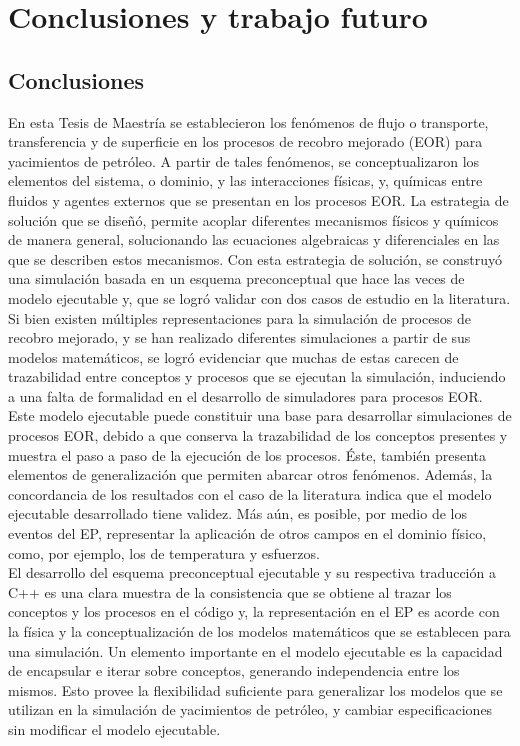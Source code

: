 \chapter{Conclusiones y trabajo futuro}\label{cap:Conclusiones}
\section{Conclusiones}


En esta Tesis de Maestría se establecieron los fenómenos de flujo o transporte, transferencia y de superficie en los procesos de recobro mejorado (EOR) para yacimientos de petróleo. A partir de tales fenómenos, se conceptualizaron los elementos del sistema, o dominio, y las interacciones físicas, y, químicas entre fluidos y agentes externos que se presentan en los procesos EOR. La estrategia de solución que se diseñó, permite acoplar diferentes mecanismos físicos y químicos de manera general, solucionando las ecuaciones algebraicas y diferenciales en las que se describen estos mecanismos. Con esta estrategia de solución, se construyó una simulación basada en un esquema preconceptual que hace las veces de modelo ejecutable y, que se logró validar con dos casos de estudio en la literatura.\\

Si bien existen múltiples representaciones para la simulación de procesos de recobro mejorado, y se han realizado diferentes simulaciones a partir de sus modelos matemáticos, se logró evidenciar que muchas de estas carecen de trazabilidad entre conceptos y procesos que se ejecutan la simulación, induciendo a una falta de formalidad en el desarrollo de simuladores para procesos EOR. Este modelo ejecutable puede constituir una base para desarrollar simulaciones de procesos EOR, debido a que conserva la trazabilidad de los conceptos presentes y muestra el paso a paso de la ejecución de los procesos. Éste, también presenta elementos de generalización que permiten abarcar otros fenómenos. Además, la concordancia de los resultados con el caso de la literatura indica que el modelo ejecutable desarrollado tiene validez. Más aún, es posible, por medio de los eventos del EP, representar la aplicación de otros campos en el dominio físico, como, por ejemplo, los de temperatura y esfuerzos.\\

El desarrollo del esquema preconceptual ejecutable y su respectiva traducción a C++ es una clara muestra de la consistencia que se obtiene al trazar los conceptos y los procesos en el código y, la representación en el EP es acorde con la física y la conceptualización de los modelos matemáticos que se establecen para una simulación. Un elemento importante en el modelo ejecutable es la capacidad de encapsular e iterar sobre conceptos, generando independencia entre los mismos. Esto provee la flexibilidad suficiente para generalizar los modelos que se utilizan en la simulación de yacimientos de petróleo, y cambiar especificaciones sin modificar el modelo ejecutable.

